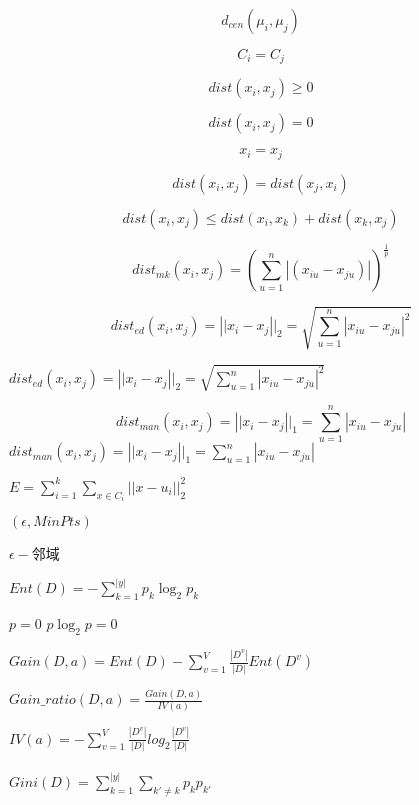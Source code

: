 \documentclass{article}
\begin{document}
\begin{equation}\label{dcen}
d_{cen}({\mu}_i,{\mu}_j)
\end{equation}

\begin{equation}\label{ccc}
C_i = C_j
\end{equation}

\begin{equation}\label{notNegative}
dist(x_i,x_j) \geqslant 0
\end{equation}

\begin{equation}\label{consistance}
dist(x_i,x_j)  = 0
\end{equation}

\begin{equation}\label{con_1}
  x_i = x_j
\end{equation}

\begin{equation}\label{symmetric}
  dist(x_i,x_j) = dist(x_j,x_i)
\end{equation}

\begin{equation}\label{Transitivity}
dist(x_i,x_j) \leqslant dist(x_i,x_k) + dist(x_k,x_j)
\end{equation}

\begin{equation}\label{minkowski}
  dist_{mk}(x_i,x_j) = (\sum_{u=1}^{n}\left| (x_{iu} - x_{ju}) \right|)^{\frac{1}{p}}
\end{equation}

\begin{equation}\label{eudistance}
  dist_{ed}(x_i,x_j) = \left||x_i-x_j\right||_2=\sqrt{\sum_{u=1}^{n}{\left|x_{iu}-x_{ju}\right|}^2}
\end{equation}

$dist_{ed}(x_i,x_j) = \left||x_i-x_j\right||_2=\sqrt{\sum_{u=1}^{n}{\left|x_{iu}-x_{ju}\right|}^2}$

\begin{equation}\label{manhattan}
  dist_{man}(x_i,x_j) = \left||x_i-x_j\right||_1=\sum_{u=1}^{n}{\left|x_{iu}-x_{ju}\right|}
\end{equation}
$  dist_{man}(x_i,x_j) = \left||x_i-x_j\right||_1=\sum_{u=1}^{n}{\left|x_{iu}-x_{ju}\right|}$

$E = \sum_{i = 1}^{k}\sum_{x \in C_i}^{ }\left||x - u_i\right||_2^2$

$(\epsilon,MinPts)$


$\epsilon-$邻域

$Ent(D) = - \sum_{k =1}^{\left|y\right|}p_{k}\log_2p_{k}$

$p = 0$
$p\log_2p = 0$

$Gain(D,a) = Ent(D) - \sum_{v=1}^{V} \frac{\left|D^v\right|}{\left|D\right|}Ent(D^v)$

$Gain\_ratio(D,a) = \frac{Gain(D,a)}{IV(a)}$


$IV(a) = -\sum_{v=1}^{V}\frac{\left|D^v\right|}{\left|D\right|}log_2\frac{\left|D^v\right|}{\left|D\right|}$
\paragraph {$Gini(D) = \sum_{k=1}^{\left|y\right|}\sum_{k' \neq k}^{ } p_kp_{k'}$}
\end{document}
